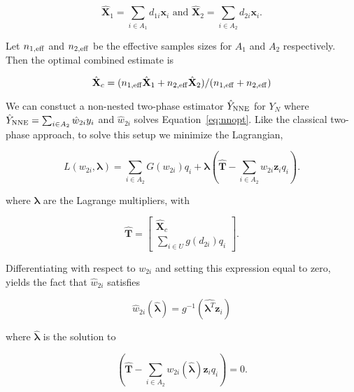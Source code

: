 \documentclass[12pt]{article}
\renewcommand{\bf}[1]{\mathbf{#1}}
\begin{document}
$$
\hat{\bf X}_1 = \sum_{i \in A_1} d_{1i} \bf x_i \text{ and }
\hat{\bf X}_2 = \sum_{i \in A_2} d_{2i} \bf x_i.
$$

Let $n_{1, \rm{eff}}$ and $n_{2, \rm{eff}}$ be the effective samples sizes for
$A_1$ and $A_2$ respectively. Then the optimal combined estimate is 

$$
\hat{\bf X}_c = (n_{1, \rm{eff}} \hat{\bf X}_1 + n_{2, \rm{eff}}\hat{\bf X}_2) / 
(n_{1, \rm{eff}} + n_{2, \rm{eff}})
$$

We can constuct a non-nested two-phase estimator $\hat Y_{\rm NNE}$ for $Y_N$ where
$\hat Y_{\rm NNE} = \sum_{i \in A_2} \hat w_{2i} y_i$ and $\hat w_{2i}$ solves
Equation~\ref{eq:nnopt}. Like the classical two-phase approach, to solve this
setup we minimize the Lagrangian,

\begin{equation}\label{eq:legragedc2}
  L(w_{2i}, \bm \lambda) = \sum_{i \in A_2} G(w_{2i}) q_i + 
  \bm \lambda \left( \hat{\bf T} - \sum_{i \in A_2} w_{2i} \bf z_i q_i\right).
\end{equation}

where $\bm \lambda$ are the Lagrange multipliers, with 

$$\hat{\bf T} = 
\begin{bmatrix}
\hat{\bf X}_c \\ \sum_{i \in U} g(d_{2i}) q_i
\end{bmatrix}.
$$

Differentiating with respect to $w_{2i}$ and setting this expression equal to
zero, yields the fact that $\hat w_{2i}$ satisfies 

$$ \hat w_{2i}(\hat{\bm \lambda}) = g^{-1}(\hat{\bm \lambda^T} \bf z_i) $$

where $\hat{\bm \lambda}$ is the solution to

\begin{equation}\label{eq:lamdc2}
  \left( \hat{\bf T} - \sum_{i \in A_2} w_{2i}(\hat{\bm \lambda}) \bf z_i
  q_i\right) = 0.
\end{equation}
\end{document}
